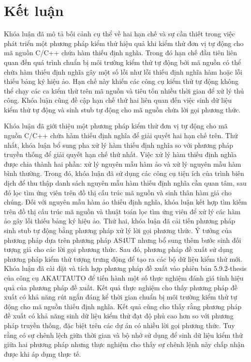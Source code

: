 \chapter*{Kết luận}\label{chap5}
Khóa luận đã mô tả bối cảnh cụ thể về hai hạn chế và sự cần thiết trong việc phát triển một phương pháp kiểm thử hiệu quả khi kiểm thử đơn vị tự động cho mã nguồn C/C++ chứa hàm thiếu định nghĩa. Trong đó hạn chế đầu tiên liên quan đến quá trình chuẩn bị môi trường kiểm thử tự động bởi mã nguồn có thể chứa hàm thiếu định nghĩa gây một số lỗi như lỗi thiếu định nghĩa hàm hoặc lỗi thiếu bảng ký hiệu ảo. Hạn chế này khiến các công cụ kiểm thử tự động không thể chạy các ca kiểm thử trên mã nguồn và tiêu tốn nhiều thời gian để xử lý thủ công. Khóa luận cũng đề cập hạn chế thứ hai liên quan đến việc sinh dữ liệu kiểm thử tự động và sinh stub tự động cho mã nguồn chứa lời gọi phương thức. 

Khóa luận đã giới thiệu một phương pháp kiểm thử đơn vị tự động cho mã nguồn C/C++ chứa hàm thiếu định nghĩa để giải quyết hai hạn chế trên. Thứ nhất, khóa luận bổ sung pha xử lý hàm thiếu định nghĩa so với phương pháp truyền thống để giải quyết hạn chế thứ nhất. Việc xử lý hàm thiếu định nghĩa được chia thành hai phần: xử lý nguyên mẫu hàm ảo và xử lý nguyên mẫu hàm bình thường. Trong đó, khóa luận đã sử dụng các công cụ tiện ích của trình biên dịch để thu thập danh sách nguyên mẫu hàm thiếu định nghĩa cần quan tâm, sau đó lọc tìm ứng viên trên đồ thị cấu trúc mã nguồn và sinh thân hàm giả cho chúng. Đối với nguyên mẫu hàm ảo thiếu định nghĩa, khóa luận kết hợp tìm kiếm trên đồ thị cấu trúc mã nguồn và thuật toán lọc tìm ứng viên để xử lý các hàm ảo gây lỗi thiếu bảng ký hiệu ảo. Thứ hai, khóa luận đã cải tiến phương pháp sinh stub tự động bằng phương pháp xử lý lời gọi phương thức. Ý tưởng của phương pháp dựa trên phương pháp AS4UT nhưng bổ sung thêm bước sinh đối tượng giả cho các lời gọi phương thức. Sau đó, phương pháp đề xuất sử dụng phương pháp kiểm thử tượng trưng động để tạo ra các bộ dữ liệu kiểm thử mới.\\

Khóa luận đã cài đặt và tích hợp phương pháp đề xuất vào phiên bản 5.9.2-thesis của công cụ AKAUTAUTO để tiến hành một số thực nghiệm đánh giá tính hiệu quả của phương pháp đề xuất. Kết quả thực nghiệm cho thấy phương pháp đề xuất có khả năng rút ngắn đáng kể thời gian chuẩn bị môi trường kiểm thử tự động cho mã nguồn thiếu định nghĩa. Kết quả cũng cho thấy rằng phương pháp đề xuất có khả năng sinh dữ liệu kiểm thử đạt độ phủ cao hơn so với phương pháp truyền thống, đặc biệt trên các dự án có nhiều lời gọi phương thức. Tuy rằng có sự chênh lệch giữa thời gian và bộ nhớ sử dụng để sinh dữ liệu kiểm thử giữa hai phương pháp nhưng thực nghiệm cho thấy sự chênh lệnh này chấp nhận được khi áp dụng thực tế. 

